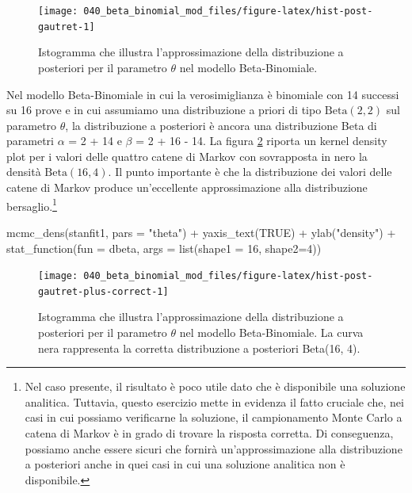 \documentclass[
  10pt,
  italian,
  a4paper,
  extrafontsizes,onecolumn,openright
  ]{memoir}
\newenvironment{Shaded}{}{}
\newcommand{\AttributeTok}[1]{\textcolor[rgb]{0.49,0.56,0.16}{#1}}
\newcommand{\ConstantTok}[1]{\textcolor[rgb]{0.53,0.00,0.00}{#1}}
\newcommand{\DecValTok}[1]{\textcolor[rgb]{0.25,0.63,0.44}{#1}}
\newcommand{\FunctionTok}[1]{\textcolor[rgb]{0.02,0.16,0.49}{#1}}
\newcommand{\NormalTok}[1]{#1}
\newcommand{\SpecialCharTok}[1]{\textcolor[rgb]{0.25,0.44,0.63}{#1}}
\newcommand{\StringTok}[1]{\textcolor[rgb]{0.25,0.44,0.63}{#1}}
\begin{document}
\begin{figure}[h]

{\centering \texttt{[image: 040\_beta\_binomial\_mod\_files/figure-latex/hist-post-gautret-1]} 

}

\caption{Istogramma che illustra l'approssimazione della distribuzione a posteriori per il parametro $\theta$ nel modello Beta-Binomiale.}\label{fig:hist-post-gautret}
\end{figure}

Nel modello Beta-Binomiale in cui la verosimiglianza è binomiale con 14 successi su 16 prove e in cui assumiamo una distribuzione a priori di tipo \(\mbox{Beta}(2, 2)\) sul parametro \(\theta\), la distribuzione a posteriori è ancora una distribuzione Beta di parametri \(\alpha\) = 2 + 14 e \(\beta\) = 2 + 16 - 14. La figura \ref{fig:hist-post-gautret-plus-correct} riporta un kernel density plot per i valori delle quattro catene di Markov con sovrapposta in nero la densità \(\mbox{Beta}(16, 4)\). Il punto importante è che la distribuzione dei valori delle catene di Markov produce un'eccellente approssimazione alla distribuzione bersaglio.\footnote{Nel caso presente, il risultato è poco utile dato che è disponibile una soluzione analitica. Tuttavia, questo esercizio mette in evidenza il fatto cruciale che, nei casi in cui possiamo verificarne la soluzione, il campionamento Monte Carlo a catena di Markov è in grado di trovare la risposta corretta. Di conseguenza, possiamo anche essere sicuri che fornirà un'approssimazione alla distribuzione a posteriori anche in quei casi in cui una soluzione analitica non è disponibile.}

\begin{Shaded}
\begin{Highlighting}[]
\FunctionTok{mcmc\_dens}\NormalTok{(stanfit1, }\AttributeTok{pars =} \StringTok{"theta"}\NormalTok{) }\SpecialCharTok{+} 
  \FunctionTok{yaxis\_text}\NormalTok{(}\ConstantTok{TRUE}\NormalTok{) }\SpecialCharTok{+} 
  \FunctionTok{ylab}\NormalTok{(}\StringTok{"density"}\NormalTok{) }\SpecialCharTok{+}
  \FunctionTok{stat\_function}\NormalTok{(}\AttributeTok{fun =}\NormalTok{ dbeta, }\AttributeTok{args =} \FunctionTok{list}\NormalTok{(}\AttributeTok{shape1 =} \DecValTok{16}\NormalTok{, }\AttributeTok{shape2=}\DecValTok{4}\NormalTok{))}
\end{Highlighting}
\end{Shaded}

\begin{figure}[h]

{\centering \texttt{[image: 040\_beta\_binomial\_mod\_files/figure-latex/hist-post-gautret-plus-correct-1]} 

}

\caption{Istogramma che illustra l'approssimazione della distribuzione a posteriori per il parametro $\theta$ nel modello Beta-Binomiale. La curva nera rappresenta la corretta distribuzione a posteriori Beta(16, 4).}\label{fig:hist-post-gautret-plus-correct}
\end{figure}
\end{document}
